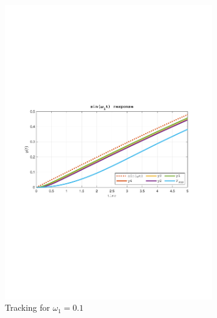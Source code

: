 \documentclass[a4paper, 12pt]{article}
\begin{document}
\begin{figure}[h!]
    \begin{subfigure}[t]{0.60\textwidth}
           \includegraphics[width=\textwidth]{Figures/fig07a.pdf}
           \caption{Tracking for $\omega_1 = 0.1$}
           \label{fig:fig07a}
       \end{subfigure}
    \begin{subfigure}[t]{0.4\textwidth}

\end{subfigure}
\end{figure}
\end{document}

